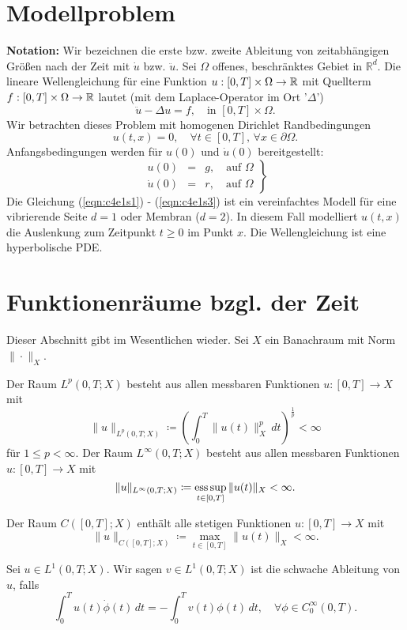 \documentclass[../skript.tex]{subfiles}
\begin{document}
\section{Modellproblem}\label{sec:c4e1}
\textbf{Notation:} Wir bezeichnen die erste bzw. zweite Ableitung von zeitabhängigen Größen nach der Zeit mit $\dot{u}$ bzw. $\ddot{u}$. Sei $\Omega$ offenes, beschränktes Gebiet in $\mathbb{R}^d$. Die lineare Wellengleichung für eine Funktion $u:[0,T]\times\Omega\to\mathbb{R}$ mit Quellterm $f:[0,T]\times\Omega\to\mathbb{R}$ lautet (mit dem Laplace-Operator im Ort '$\Delta$')
\begin{equation}\label{eqn:c4e1s1}
	\ddot{u}-\Delta u = f,\quad\text{in }[0,T]\times\Omega.
\end{equation}
Wir betrachten dieses Problem mit homogenen Dirichlet Randbedingungen
\begin{equation}\label{eqn:c4e1s2}
	u(t,x) = 0,\quad\forall t\in[0,T],\,\forall x\in\partial\Omega.
\end{equation}
Anfangsbedingungen werden für $u(0)$ und $\dot{u}(0)$ bereitgestellt:
\begin{equation}\label{eqn:c4e1s3}
	\left.
	\begin{aligned}
		u(0) &=& g,\quad\text{auf }\Omega\\
		\dot{u}(0) &=& r,\quad\text{auf }\Omega
	\end{aligned}
	\right\}
\end{equation}
Die Gleichung (\ref {eqn:c4e1s1}) - (\ref {eqn:c4e1s3}) ist ein vereinfachtes Modell für eine vibrierende Seite $d=1$ oder Membran ($d=2$). In diesem Fall modelliert $u(t,x)$ die Auslenkung zum Zeitpunkt $t\geq 0$ im Punkt $x$. Die Wellengleichung ist eine hyperbolische PDE.

\section{Funktionenräume bzgl. der Zeit} 
Dieser Abschnitt gibt im Wesentlichen \cite[Sec. 5.9.2]{Evans} wieder. Sei $X$ ein Banachraum mit Norm $\|\cdot\|_X$.
\begin{definition}\label{def:c4e2s1}
	Der Raum $L^p(0,T;X)$ besteht aus allen messbaren Funktionen $u:[0,T]\to X$ mit
	\[
		\|u\|_{L^p(0,T;X)} \coloneqq \left( \int_0^T \|u(t)\|_X^p\,dt \right)^{\frac{1}{p}} < \infty
	\]
	für $1\leq p < \infty$.\newline\noindent
	Der Raum $L^\infty(0,T;X)$ besteht aus allen messbaren Funktionen $u:[0,T]\to X$ mit 
	\[
		\|u\|_{L^\infty(0,T;X)} \coloneqq \operatorname*{ess\,sup}_{t\in[0,T]} \|u(t)\|_X < \infty.
	\]
\end{definition}

\begin{definition}\label{def:c4e2s2}
	Der Raum $C([0,T];X)$ enthält alle stetigen Funktionen $u:[0,T]\to X$ mit 
	\[
		\|u\|_{C([0,T];X)} \coloneqq \max_{t\in[0,T]} \|u(t)\|_X < \infty.
	\]
\end{definition}

\begin{definition}\label{def:c4e2s3}
	Sei $u\in L^1(0,T;X)$. Wir sagen $v\in L^1(0,T;X)$ ist die schwache Ableitung von $u$, falls
	\[
		\int_0^T u(t)\dot{\phi}(t)\,dt = - \int_0^T v(t)\phi(t)\,dt,\quad\forall\phi\in C^\infty_0(0,T).
	\]
\end{definition}
\end{document}
